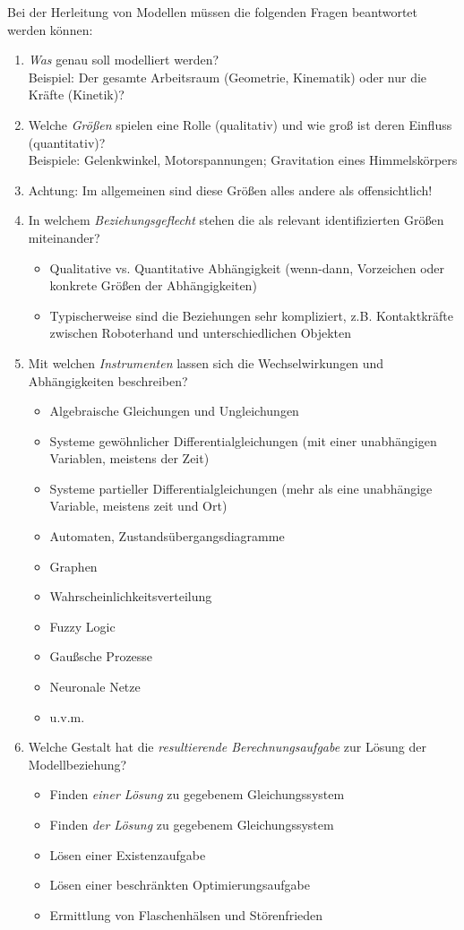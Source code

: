 			Bei der Herleitung von Modellen müssen die folgenden Fragen beantwortet werden können:
			\begin{enumerate}
				\item \textit{Was} genau soll modelliert werden? \\ Beispiel: Der gesamte Arbeitsraum (Geometrie, Kinematik) oder nur die Kräfte (Kinetik)?
				\item Welche \textit{Größen} spielen eine Rolle (qualitativ) und wie groß ist deren Einfluss (quantitativ)? \\ Beispiele: Gelenkwinkel, Motorspannungen; Gravitation eines Himmelskörpers
				\item[] Achtung: Im allgemeinen sind diese Größen alles andere als offensichtlich!
				\item In welchem \textit{Beziehungsgeflecht} stehen die als relevant identifizierten Größen miteinander?
					\begin{itemize}
						\item Qualitative vs. Quantitative Abhängigkeit (wenn-dann, Vorzeichen oder konkrete Größen der Abhängigkeiten)
						\item Typischerweise sind die Beziehungen sehr kompliziert, z.B. Kontaktkräfte zwischen Roboterhand und unterschiedlichen Objekten
					\end{itemize}
				\item Mit welchen \textit{Instrumenten} lassen sich die Wechselwirkungen und Abhängigkeiten beschreiben?
					\begin{itemize}
						\item Algebraische Gleichungen und Ungleichungen
						\item Systeme gewöhnlicher Differentialgleichungen (mit einer unabhängigen Variablen, meistens der Zeit)
						\item Systeme partieller Differentialgleichungen (mehr als eine unabhängige Variable, meistens zeit und Ort)
						\item Automaten, Zustandsübergangsdiagramme
						\item Graphen
						\item Wahrscheinlichkeitsverteilung
						\item Fuzzy Logic
						\item Gaußsche Prozesse
						\item Neuronale Netze
						\item u.v.m.
					\end{itemize}
				\item Welche Gestalt hat die \textit{resultierende Berechnungsaufgabe} zur Lösung der Modellbeziehung?
					\begin{itemize}
						\item Finden \textit{einer Lösung} zu gegebenem Gleichungssystem
						\item Finden \textit{der Lösung} zu gegebenem Gleichungssystem
						\item Lösen einer Existenzaufgabe
						\item Lösen einer beschränkten Optimierungsaufgabe
						\item Ermittlung von Flaschenhälsen und Störenfrieden
					\end{itemize}
			\end{enumerate}
